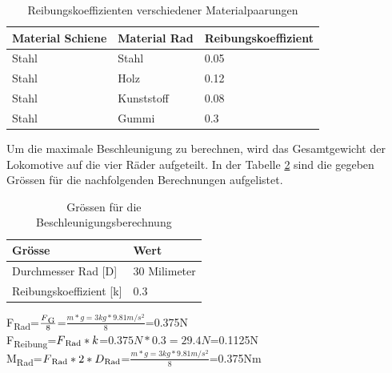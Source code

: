 \documentclass[../../main.tex]{subfiles}
\begin{document}
    \begin{table}[H] \centering
        \begin{tabular}{|l|l|l|}
        \hline
        \textbf{Material Schiene} & \textbf{Material Rad} & \textbf{Reibungskoeffizient}\\
        \hline
        Stahl                                & Stahl        & 0.05\\
        \hline
        Stahl                                & Holz         & 0.12\\
        \hline
        Stahl                                & Kunststoff   & 0.08\\
        \hline
        Stahl                                & Gummi        & 0.3\\
        \hline
        \end{tabular}
        
        \caption{Reibungskoeffizienten verschiedener Materialpaarungen}
        \label{tab:com_tiny_pi}
        \end{table}
    
    Um die maximale Beschleunigung zu berechnen, wird das Gesamtgewicht der Lokomotive auf die vier Räder aufgeteilt. In der Tabelle \ref{tab:groessen_beschleunigung} sind die gegeben Grössen für die nachfolgenden Berechnungen aufgelistet.\\

    \begin{table}[H] \centering
        \begin{tabular}{|l|l|}
        \hline
        \textbf{Grösse} & \textbf{Wert}\\
        \hline
        Durchmesser Rad [D]          & 30 Milimeter\\
         \hline
        Reibungskoeffizient [k]      & 0.3\\
        \hline
        \end{tabular}
        
        \caption{Grössen für die Beschleunigungsberechnung}
        \label{tab:groessen_beschleunigung}
        \end{table}   

    F\textsubscript{Rad}=\(\frac{F\textsubscript{G}}{8}\)=\(\frac{m*g=3kg*9.81m/s^2}{8}\)=0.375N\\

    F\textsubscript{Reibung}=\(F\textsubscript{Rad}*k\)=\(0.375N*0.3=29.4N\)=0.1125N\\

    M\textsubscript{Rad}=\(F\textsubscript{Rad}*2*D\textsubscript{Rad}\)=\(\frac{m*g=3kg*9.81m/s^2}{8}\)=0.375Nm\\
\end{document}
